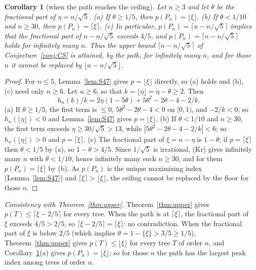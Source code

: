 \documentclass[11pt]{amsart}
\newtheorem{corollary}[theorem]{Corollary}
\theoremstyle{definition}
\theoremstyle{remark}
\newcommand{\frc}[1]{\{#1\}}
\begin{document}
\begin{corollary}[when the path reaches the ceiling]\label{cor:pathceil}
Let $n\ge3$ and let $\theta$ be the fractional part of $\eta=n/\sqrt5$.
(a) If $\theta\ge1/5$, then $p(P_n)=\lfloor \xi\rfloor$. (b) If $\theta<1/10$ and
$n\ge30$, then $p(P_n)=\lceil \xi\rceil$. (c) In particular,
$p(P_n)=\lceil n-n/\sqrt5\rceil$ implies that the fractional part of
$n-n/\sqrt5$ exceeds $4/5$, and $p(P_n)=\lceil n-n/\sqrt5\rceil$ holds for
infinitely many $n$. Thus the upper bound $\lceil n-n/\sqrt5\rceil$ of
Conjecture~\ref{conj:CS} is attained, by the path, for infinitely many $n$,
and for those $n$ it cannot be replaced by $\lfloor n-n/\sqrt5\rfloor$.
\end{corollary}

\begin{proof}
For $n\le5$, Lemma~\ref{lem:S47} gives $p=\lfloor \xi\rfloor$ directly, so (a)
holds and (b), (c) need only $n\ge6$. Let $n\ge6$, so that
$k=\lfloor \eta\rfloor=\eta-\theta\ge2$. Then
\[
h_n(k)/k=2\eta(1-5\theta)+5\theta^2-2\theta-4-2/k .
\]
(a) If $\theta\ge1/5$, the first term is $\le0$, $5\theta^2-2\theta-4<0$ on
$[0,1)$, and $-2/k<0$; so $h_n(\lfloor \eta\rfloor)<0$ and Lemma~\ref{lem:S47}
gives $p=\lfloor \xi\rfloor$. (b) If $\theta<1/10$ and $n\ge30$, the first term
exceeds $\eta\ge30/\sqrt5>13$, while $|5\theta^2-2\theta-4-2/k|<6$; so
$h_n(\lfloor \eta\rfloor)>0$ and $p=\lceil \xi\rceil$. (c) The fractional part of
$\xi=n-\eta$ is $1-\theta$; if $p=\lceil \xi\rceil$ then $\theta<1/5$ by (a), so
$1-\theta>4/5$. Since $1/\sqrt5$ is irrational, (Kr) gives infinitely many
$n$ with $\theta<1/10$, hence infinitely many such $n\ge30$, and for them
$p(P_n)=\lceil \xi\rceil$ by (b). As $p(P_n)$ is the unique maximizing index
(Lemma~\ref{lem:S47}) and $\lceil \xi\rceil>\lfloor \xi\rfloor$, the ceiling cannot
be replaced by the floor for those $n$.
\end{proof}

\emph{Consistency with Theorem~\ref{thm:upper}.} Theorem~\ref{thm:upper} gives
$p(T)\le\lceil \xi-2/5\rceil$ for every tree. When the path is at $\lceil \xi\rceil$,
the fractional part of $\xi$ exceeds $4/5>2/5$, so
$\lceil \xi-2/5\rceil=\lceil \xi\rceil$: no contradiction. When the fractional
part of $\xi$ is below $2/5$ (which implies $\theta=1-\frc{\xi}>3/5\ge1/5$),
Theorem~\ref{thm:upper} gives $p(T)\le\lfloor \xi\rfloor$ for every tree $T$ of
order $n$, and Corollary~\ref{cor:pathceil}(a) gives $p(P_n)=\lfloor \xi\rfloor$; so
for those $n$ the path has the largest peak index among trees of order $n$.
\end{document}
